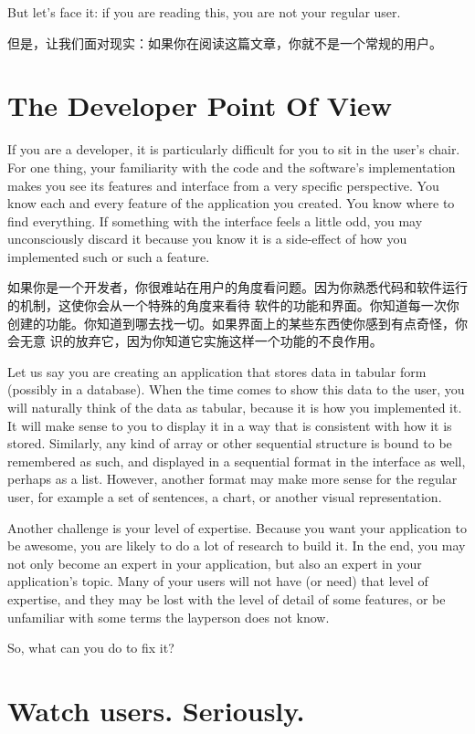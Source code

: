But let's face it: if you are reading this, you are not your regular user.

但是，让我们面对现实：如果你在阅读这篇文章，你就不是一个常规的用户。

\section*{The Developer Point Of View}

If you are a developer, it is particularly difficult for you to sit in the user's chair. For one
thing, your familiarity with the code and the software's implementation makes
you see its features and interface from a very specific perspective. You
know each and every feature of the application you created. You know where to
find everything. If something with the interface feels a little odd, you may
unconsciously discard it because you know it is a side-effect of how you
implemented such or such a feature.

如果你是一个开发者，你很难站在用户的角度看问题。因为你熟悉代码和软件运行的机制，这使你会从一个特殊的角度来看待
软件的功能和界面。你知道每一次你创建的功能。你知道到哪去找一切。如果界面上的某些东西使你感到有点奇怪，你会无意
识的放弃它，因为你知道它实施这样一个功能的不良作用。

Let us say you are creating an application that stores data in tabular form
(possibly in a database). When the time comes to show this data to the user, you
will naturally think of the data as tabular, because it is how you implemented
it. It will make sense to you to display it in a way that is consistent with how
it is stored. Similarly, any kind of array or other sequential structure is
bound to be remembered as such, and displayed in a sequential format in the
interface as well, perhaps as a list. However, another format may make more
sense for the regular user, for example a set of sentences, a chart, or another
visual representation.

Another challenge is your level of expertise. Because you want your
application to be awesome, you are likely to do a lot of research to build it.
In the end, you may not only become an expert in your application, but also an
expert in your application's topic. Many of your users will not have (or need)
that level of expertise, and they may be lost with the level of detail of some
features, or be unfamiliar with some terms the layperson does not know.

So, what can you do to fix it?

\section*{Watch users. Seriously.}

